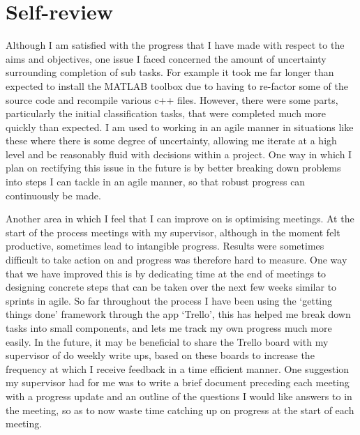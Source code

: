 \documentclass[fleqn,12pt]{wlscirep}
\begin{document}
\section*{Self-review}
Although I am satisfied with the progress that I have made with respect to the aims and objectives, one issue I faced concerned the amount of uncertainty surrounding completion of sub tasks. For example it took me far longer than expected to install the MATLAB toolbox due to having to re-factor some of the source code and recompile various c++ files. However, there were some parts, particularly the initial classification tasks, that were completed much more quickly than expected. I am used to working in an agile manner in situations like these where there is some degree of uncertainty, allowing me iterate at a high level and be reasonably fluid with decisions within a project. One way in which I plan on rectifying this issue in the future is by better breaking down problems into steps I can tackle in an agile manner, so that robust progress can continuously be made.

Another area in which I feel that I can improve on is optimising meetings. At the start of the process meetings with my supervisor, although in the moment felt productive, sometimes lead to intangible progress. Results were sometimes difficult to take action on and progress was therefore hard to measure. One way that we have improved this is by dedicating time at the end of meetings to designing concrete steps that can be taken over the next few weeks similar to sprints in agile. So far throughout the process I have been using the ‘getting things done’ framework through the app ‘Trello’, this has helped me break down tasks into small components, and lets me track my own progress much more easily. In the future, it may be beneficial to share the Trello board with my supervisor of do weekly write ups, based on these boards to increase the frequency at which I receive feedback in a time efficient manner. One suggestion my supervisor had for me was to write a brief document preceding each meeting with a progress update and an outline of the questions I would like answers to in the meeting, so as to now waste time catching up on progress at the start of each meeting.






\end{document}
